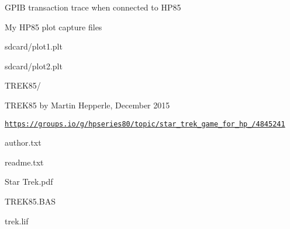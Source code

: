 \begin{DoxyItemize}
\begin{DoxyItemize}
\begin{DoxyItemize}
\begin{DoxyItemize}
\item G\+P\+IB transaction trace when connected to H\+P85
\end{DoxyItemize}
\end{DoxyItemize}
\item My H\+P85 plot capture files
\begin{DoxyItemize}
\item sdcard/plot1.\+plt
\item sdcard/plot2.\+plt
\end{DoxyItemize}
\item T\+R\+E\+K85/
\begin{DoxyItemize}
\item T\+R\+E\+K85 by Martin Hepperle, December 2015
\item \href{https://groups.io/g/hpseries80/topic/star_trek_game_for_hp_85/4845241}{\tt https\+://groups.\+io/g/hpseries80/topic/star\+\_\+trek\+\_\+game\+\_\+for\+\_\+hp\+\_/4845241}
\begin{DoxyItemize}
\item author.\+txt
\item readme.\+txt
\item Star Trek.\+pdf
\item T\+R\+E\+K85.\+B\+AS
\item trek.\+lif 
\end{DoxyItemize}
\end{DoxyItemize}
\end{DoxyItemize}
\end{DoxyItemize}